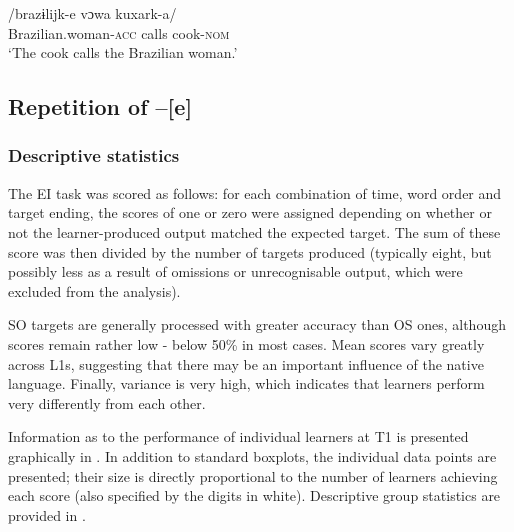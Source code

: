 \ea%
    \label{ex:04:9}
    \glt    
    \ex\label{ex:04:9b}
    \gll    /brazɨlijk-e     vɔwa   kuxark-a/\\
            Brazilian.woman-\textsc{acc}   calls   cook-\textsc{nom}\\
    \glt    ‘The cook calls the Brazilian woman.’
    \z
\z

\subsection{Repetition of –[e]}\label{sec:04:2.3}

\subsubsection{Descriptive statistics}\label{sec:04:2.3.1}

The EI task was scored as follows: for each combination of time, word order and target ending, the scores of one or zero were assigned depending on whether or not the learner-produced output matched the expected target. The sum of these score was then divided by the number of targets produced (typically eight, but possibly less as a result of omissions or unrecognisable output, which were excluded from the analysis).

SO targets are generally processed with greater accuracy than OS ones, although scores remain rather low - below 50\% in most cases. Mean scores vary greatly across L1s, suggesting that there may be an important influence of the native language. Finally, variance is very high, which indicates that learners perform very differently from each other.

Information as to the performance of individual learners at T1 is presented graphically in . In addition to standard boxplots, the individual data points are presented; their size is directly proportional to the number of learners achieving each score (also specified by the digits in white). Descriptive group statistics are provided in .

